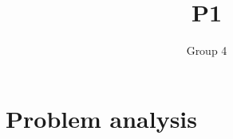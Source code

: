 \documentclass[11pt]{report}
\title{P1}
\author{Group 4}
\begin{document}
    \maketitle


    \chapter{Problem analysis}\label{ch:problem-analysis}

    
    
    
    
    
    

    
    
\end{document}
